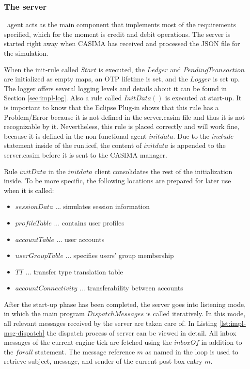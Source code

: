 \subsubsection{The server}\ agent acts as the main component that implements most of the  requirements specified, which for the moment is credit and debit operations. The server is started right away when CASIMA has received and processed the JSON file for the simulation.

When the init-rule called $Start$ is executed, the $Ledger$ and $PendingTransaction$ are initialized as empty maps, an OTP lifetime is set, and the $Logger$ is set up. The logger offers several logging levels and details about it can be found in Section \ref{sec:impl-log}. Also a rule called $InitData()$ is executed at start-up. It is important to know that the Eclipse Plug-in shows that this rule has a Problem/Error because it is not defined in the server.casim file and thus it is not recognizable by it. Nevertheless, this rule is placed correctly and will work fine, because it is defined in the non-functional agent $initdata$. Due to the $include$ statement inside of the run.icef, the content of $initdata$ is appended to the server.casim before it is sent to the CASIMA manager.

Rule $initData$ in the $initdata$ client consolidates the rest of the initialization inside. To be more specific, the following locations are prepared for later use when it is called:

\begin{itemize}
	\item $sessionData$ ... simulates session information
	\item $profileTable$ ... contains user profiles
	\item $accountTable$ ... user accounts
	\item $userGroupTable$ ... specifies users' group membership
	\item $TT$ ... transfer type translation table
	\item $accountConnectivity$ ... transferability between accounts
\end{itemize}

After the start-up phase has been completed, the server goes into listening mode, in which the main program $DispatchMessages$ is called iteratively. In this mode, all relevant messages received by the server are taken care of. In Listing \ref{lst:impl-msg-dispatch} the dispatch process of server can be viewed in detail. All inbox messages of the current engine tick are fetched using the $inboxOf$ in addition to the $forall$ statement. The message reference $m$ as named in the loop is used to retrieve subject, message, and sender of the current post box entry $m$.

